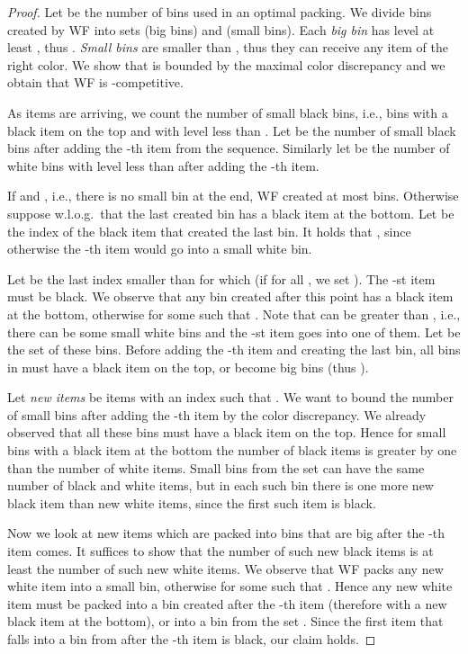 \documentclass[11pt,a4paper]{article}
\begin{document}
\begin{proof}
Let  be the number of bins used in an optimal packing.
We divide bins created by WF into sets  (big bins) and  (small bins).
Each \textit{big bin} has level at least , thus .
\textit{Small bins} are smaller than , thus they can receive any item of the right color.
We show that  is bounded by the maximal color discrepancy  and we obtain that WF is -competitive.

As items are arriving, we count the number of small black bins, i.e.,
bins with a black item on the top and with level less than .
Let  be the number of small black bins after adding the -th item from the sequence.
Similarly let  be the number of white bins with level less than  after adding the -th item. 

If  and , i.e., there is no small bin at the end, WF created at most  bins.
Otherwise suppose w.l.o.g.\ that the last created bin has a black item at the bottom.
Let  be the index of the black item that created the last bin.
It holds that , since otherwise the -th item would go into a small white bin.

Let  be the last index smaller than  for which  (if  for all , we set ).
The -st item must be black.
We observe that any bin created after this point has a black item at the bottom,
otherwise  for some  such that .
Note that  can be greater than , i.e., there can be some small white bins
and the -st item goes into one of them.
Let  be the set of these bins.
Before adding the -th item and creating the last bin, all bins in  must have a black item on the top, or become big bins (thus ).

Let \textit{new items} be items with an index  such that .
We want to bound the number of small bins after adding the -th item by the color discrepancy.
We already observed that all these bins must have a black item on the top.
Hence for small bins with a black item at the bottom the number of black items is greater by one than the number of white items.
Small bins from the set  can have the same number of black and white items,
but in each such bin there is one more new black item than new white items, since the first such item is black.

Now we look at new items which are packed
into bins that are big after the -th item comes.
It suffices to show that the number of such new black items is at least the number of such new white items.
We observe that WF packs any new white item into a small bin,
otherwise  for some  such that .
Hence any new white item must be packed into a bin created after the -th item (therefore with a new black item at the bottom),
or into a bin from the set .
Since the first item that falls into a bin from  after the -th item is black, our claim holds.


\end{proof}
\end{document}
